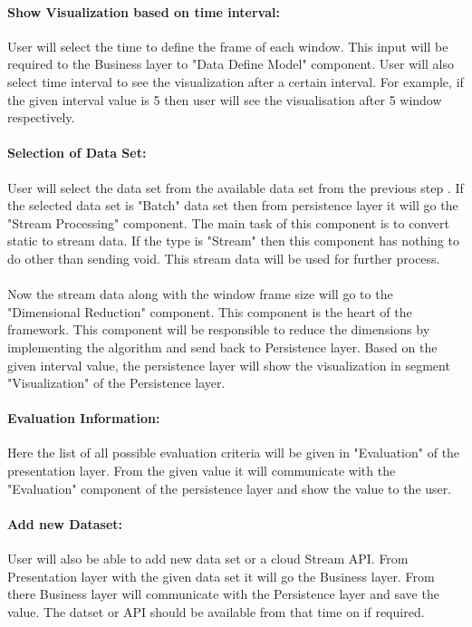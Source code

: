 \paragraph{Show Visualization based on time interval:}
User will select the time to define the frame of each window. This input will be required to the Business layer to "Data Define Model" component. User will also select time interval to see the visualization after a certain interval. For example, if the given interval value is 5 then user will see the visualisation after 5 window respectively.  
\paragraph{Selection of Data Set:}
User will select the data set from the available data set from the previous step . If the selected data set is "Batch" data set then from persistence layer it will go the "Stream Processing" component. The main task of this component is to convert static to stream data. If the type is "Stream" then this component has nothing to do other than sending void. This stream data will be used for further process.\\\\
Now the stream data along with the window frame size will go to the "Dimensional Reduction" component. This component is the heart of the framework. This component will be responsible to reduce the dimensions by implementing the algorithm and send back to Persistence layer. Based on the given interval value, the persistence layer will show the visualization in segment "Visualization" of the Persistence layer.
\paragraph{Evaluation Information:}
Here the list of all possible evaluation criteria will be given in "Evaluation" of the presentation layer. From the given value it will communicate with the "Evaluation" component of the persistence layer and show the value to the user.
\paragraph{Add new Dataset:}
User will also be able to add new data set or a cloud Stream API. From Presentation layer with the given data set it will go the Business layer. From there Business layer will communicate  with the Persistence layer and save the value. The datset or API should be available from that time on if required.

